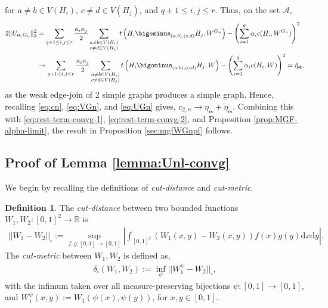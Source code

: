 \documentclass[11pt,reqno]{amsart}
\numberwithin{equation}{section}
\theoremstyle{definition}
\newtheorem{definition}{Definition}[section]
\begin{document}
for $a\neq b\in V(H_{i})$, $c\neq d\in V(H_{j})$, and $q+1\leq i,j\leq r$. Thus, on the set $\mathcal A$, 
\begin{align}\label{eq:UGn}
    2 \|U_{\bm \alpha, G_n}\|_{2}^{2} & = \sum_{ q+1 \leq i,j \leq r} \dfrac{\kappa_i \kappa_j}{2}\sum_{\substack{a\neq b\in V(H_{i})\\c\neq d\in V(H_{j})}}t\left(H_{i}\bigominus_{(a,b),(c,d)}H_{j},W^{G_{n}}\right) - \left(\sum_{i=1}^{q}\alpha_{i}c(H_{i},W^{G_{n}})\right)^{2} \nonumber \\ 
       & \rightarrow \sum_{ q+1 \leq i,j \leq r} \dfrac{\kappa_i \kappa_j}{2}\sum_{\substack{a\neq b\in V(H_{i})\\c\neq d\in V(H_{j})}}t\left(H_{i}\bigominus_{(a,b),(c,d)}H_{j},W \right) - \left(\sum_{i=1}^{q}\alpha_{i}c(H_{i},W)\right)^{2} 
       = \tilde{\eta}_{\bm \alpha} , 
\end{align} 
as the weak edge-join of 2 simple graphs produces a simple graph. 
Hence, recalling \eqref{eq:cn}, \eqref{eq:VGn}, and \eqref{eq:UGn} gives, $c_{2, n} \rightarrow \eta_{\bm \alpha} + \tilde{\eta}_{\bm \alpha}$. Combining this with \eqref{eq:rest-term-convg-1}, \eqref{eq:rest-term-convg-2}, and Proposition \ref{prop:MGF-alpha-limit}, the result in Proposition \ref{sec:mgfWGnpf} follows.



\subsection{Proof of Lemma \ref{lemma:Unl-convg}} 
\label{sec:Unlpf}

We begin by recalling the definitions of {\it cut-distance} and {\it cut-metric}. 

\begin{definition}\label{defn:Wconvergence} \cite[Chapter 8]{lovasz2012large}
The {\it cut-distance} between two bounded functions $W_1, W_2 : [0, 1]^2 \rightarrow \mathbb R$ is 
\begin{align*}
||W_1-W_2||_{\square}:=\sup_{f, g: [0, 1] \rightarrow [0, 1]} \left|\int_{[0, 1]^2} \left(W_1(x, y)-W_2(x, y)\right) f(x) g(y) \mathrm dx \mathrm dy \right|. 
\end{align*} 
The {\it cut-metric} between $W_1, W_2$ is defined as,  
\begin{align*}
\delta_{\square}(W_1, W_2):= \inf_{\psi}||W_1^{\psi}-W_2||_{\square}, 
\end{align*} 
with the infimum taken over all measure-preserving bijections $\psi: [0, 1] \rightarrow [0, 1]$, and  $W_1^\psi(x, y):= W_1(\psi(x), \psi(y))$, for $x, y \in [0, 1]$. 
\end{definition}
\end{document}
